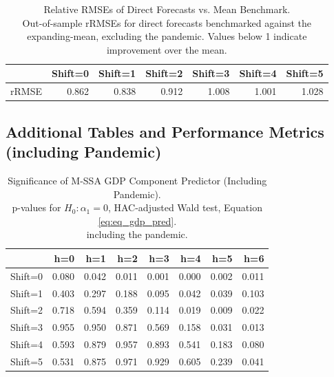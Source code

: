\documentclass[11pt,a4paper]{article}
\begin{document}
\begin{table}[ht]
\caption{Relative RMSEs of Direct Forecasts vs. Mean Benchmark.\\
Out-of-sample rRMSEs for direct forecasts benchmarked against the expanding-mean, excluding the pandemic. Values below 1 indicate improvement over the mean.
\label{tab:rRMSE_mSSA_direct_mean_without_covid8}}
\centering
\begin{tabular}{rrrrrrr}
  \hline
 & Shift=0 & Shift=1 & Shift=2 & Shift=3 & Shift=4 & Shift=5 \\ 
  \hline
rRMSE & 0.862 & 0.838 & 0.912 & 1.008 & 1.001 & 1.028 \\  
   \hline
\end{tabular}
\end{table}



\newpage
\subsection{Additional Tables and Performance Metrics (including Pandemic)}

\begin{table}[ht]
\caption{Significance of M-SSA GDP Component Predictor (Including Pandemic).\\
p-values for $H_0: {\alpha_1} = 0$, HAC-adjusted Wald test, Equation \eqref{eq:eq_gdp_pred}.\\ including the pandemic.} 
\label{tab:p_val1}
\centering
\begin{tabular}{rrrrrrrr}
  \hline
 & h=0 & h=1 & h=2 & h=3 & h=4 & h=5 & h=6 \\ 
  \hline
Shift=0 & 0.080 & 0.042 & 0.011 & 0.001 & 0.000 & 0.002 & 0.011 \\ 
  Shift=1 & 0.403 & 0.297 & 0.188 & 0.095 & 0.042 & 0.039 & 0.103 \\ 
  Shift=2 & 0.718 & 0.594 & 0.359 & 0.114 & 0.019 & 0.009 & 0.022 \\ 
  Shift=3 & 0.955 & 0.950 & 0.871 & 0.569 & 0.158 & 0.031 & 0.013 \\ 
  Shift=4 & 0.593 & 0.879 & 0.957 & 0.893 & 0.541 & 0.183 & 0.080 \\ 
  Shift=5 & 0.531 & 0.875 & 0.971 & 0.929 & 0.605 & 0.239 & 0.041 \\ 
   \hline
\end{tabular}
\end{table}
\end{document}
